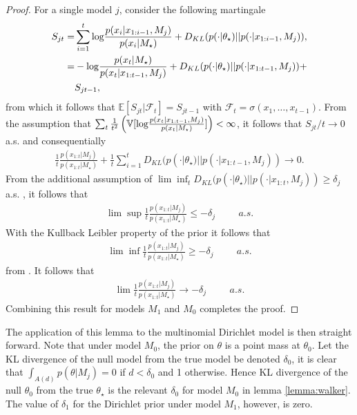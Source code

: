 \documentclass[11pt]{article}
\def\log{{\rm log}}
\begin{document}
\begin{proof}
  For a single model $j$, consider the following martingale
  \begin{align*}
    \label{eq:walker_martingale}
    S_{jt} =& \sum_{i=1}^{t} \log \frac{p(x_i|x_{1:i-1},M_j)}{p(x_i|M_\star)} + D_{KL}(p(\cdot|\theta_\star)||p(\cdot|x_{1:i-1}, M_j) ),\\
    =& -\log \frac{p(x_t|M_\star)}{p(x_t|x_{1:t-1},M_j)} + D_{KL}(p(\cdot|\theta_\star)||p(\cdot|x_{1:t-1}, M_j) ) +\\
    &S_{jt-1},\\
  \end{align*}
  from which it follows that $\mathbb{E}[S_{jt}|\mathcal{F}_t] = S_{jt-1}$ with $\mathcal{F}_t = \sigma(x_1,\dots,x_{t-1})$. From the assumption that  $\sum_t \frac{1}{t^2} \left( \mathbb{V}[\log \frac{p(x_t|x_{1:t-1},M_j)}{p(x_t|M_\star )}]\right) < \infty$, it follows that $S_{jt}/t \rightarrow 0$ a.s. and consequentially
  \begin{align*}
    \frac{1}{t} \frac{p(x_{1:t}|M_j)}{p(x_{1:t}|M_\star)} + \frac{1}{t}\sum_{i=1}^t  D_{KL}(p(\cdot|\theta_\star)||p(\cdot|x_{1:t-1}, M_j) )\rightarrow 0.
  \end{align*}
  From the additional assumption of $\lim \inf_t D_{KL}(p(\cdot|\theta_\star)||p(\cdot|x_{1:t}, M_j) ) \geq \delta_j$ a.s. , it follows that
  \begin{align*}
    \lim \sup   \frac{1}{t} \frac{p(x_{1:t}|M_j)}{p(x_{1:t}|M_\star)} \leq - \delta_j \hspace{1cm} a.s.
  \end{align*}
  With the Kullback Leibler property of the prior it follows that
  \begin{align*}
     \lim \inf   \frac{1}{t} \frac{p(x_{1:t}|M_j)}{p(x_{1:t}|M_\star)} \geq - \delta_j \hspace{1cm} a.s.
  \end{align*}
  from \cite{barron}. It follows that
    \begin{align*}
     \lim   \frac{1}{t} \frac{p(x_{1:t}|M_j)}{p(x_{1:t}|M_\star)} \rightarrow - \delta_j \hspace{1cm} a.s.
    \end{align*}
    Combining this result for models $M_1$ and $M_0$ completes the proof.
\end{proof}

The application of this lemma to the multinomial Dirichlet model is then straight forward. Note that under model $M_0$, the prior on $\theta$ is a point mass at $\theta_0$. Let the KL divergence of the null model from the true model be denoted $\delta_0$, it is clear that $\int_{A(d)} p(\theta|M_j) = 0$ if $d<\delta_0$ and 1 otherwise. Hence KL divergence of the null $\theta_0$ from the true $\theta_\star$ is the relevant $\delta_0$ for model $M_0$ in lemma \ref{lemma:walker}. The value of $\delta_1$ for the Dirichlet prior under model $M_1$, however, is zero. 
\end{document}
